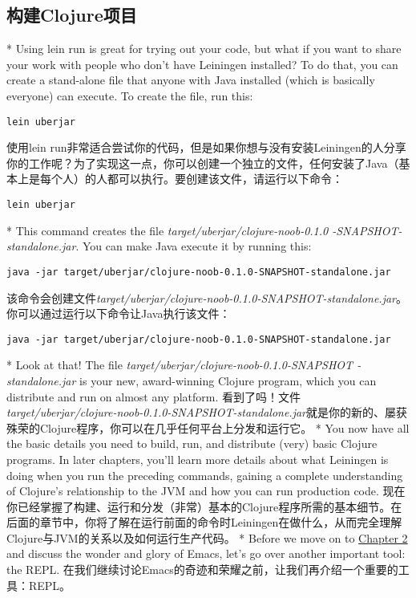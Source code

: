 \begin{paracol}{2}
\subsection{构建Clojure项目}
\switchcolumn[0]*
Using lein run is great for trying out your code, but what if you want
to share your work with people who don't have Leiningen installed? To do
that, you can create a stand-alone file that anyone with Java installed
(which is basically everyone) can execute. To create the file, run this:
\begin{verbatim}
lein uberjar
\end{verbatim}
\switchcolumn
使用lein run非常适合尝试你的代码，但是如果你想与没有安装Leiningen的人分享你的工作呢？为了实现这一点，你可以创建一个独立的文件，任何安装了Java（基本上是每个人）的人都可以执行。要创建该文件，请运行以下命令：
\begin{verbatim}
lein uberjar
\end{verbatim}
\switchcolumn[0]*
This command creates the file \emph{target/uberjar/clojure-noob-0.1.0
-SNAPSHOT-standalone.jar}. You can make Java execute it by running this:
\begin{verbatim}
java -jar target/uberjar/clojure-noob-0.1.0-SNAPSHOT-standalone.jar
\end{verbatim}
\switchcolumn
该命令会创建文件\emph{target/uberjar/clojure-noob-0.1.0-SNAPSHOT-standalone.jar}。你可以通过运行以下命令让Java执行该文件：
\begin{verbatim}
java -jar target/uberjar/clojure-noob-0.1.0-SNAPSHOT-standalone.jar
\end{verbatim}
\switchcolumn[0]*
Look at that! The file \emph{target/uberjar/clojure-noob-0.1.0-SNAPSHOT
-standalone.jar} is your new, award-winning Clojure program, which you
can distribute and run on almost any platform.
\switchcolumn
看到了吗！文件\emph{target/uberjar/clojure-noob-0.1.0-SNAPSHOT-standalone.jar}就是你的新的、屡获殊荣的Clojure程序，你可以在几乎任何平台上分发和运行它。
\switchcolumn[0]*
You now have all the basic details you need to build, run, and
distribute (very) basic Clojure programs. In later chapters, you'll
learn more details about what Leiningen is doing when you run the
preceding commands, gaining a complete understanding of Clojure's
relationship to the JVM and how you can run production code.
\switchcolumn
现在你已经掌握了构建、运行和分发（非常）基本的Clojure程序所需的基本细节。在后面的章节中，你将了解在运行前面的命令时Leiningen在做什么，从而完全理解Clojure与JVM的关系以及如何运行生产代码。
\switchcolumn[0]*
Before we move on to \href{javascript:void(0)}{Chapter 2} and discuss
the wonder and glory of Emacs, let's go over another important tool: the
REPL.
\switchcolumn
在我们继续讨论Emacs的奇迹和荣耀之前，让我们再介绍一个重要的工具：REPL。


\end{paracol}
